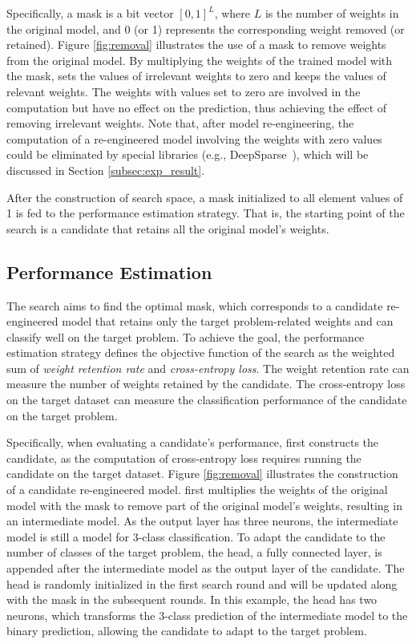 Specifically, a mask is a bit vector $[0,1]^L$, where $L$ is the number of weights in the original model, and 0 (or 1) represents the corresponding weight removed (or retained). 
Figure \ref{fig:removal} illustrates the use of a mask to remove weights from the original model.
By multiplying the weights of the trained model with the mask, \projectName sets the values of irrelevant weights to zero and keeps the values of relevant weights. 
The weights with values set to zero are involved in the computation but have no effect on the prediction, thus achieving the effect of removing irrelevant weights.
Note that, after model re-engineering, the computation of a re-engineered model involving the weights with zero values could be eliminated by special libraries (e.g., DeepSparse~\cite{deepsparse}), which will be discussed in Section \ref{subsec:exp_result}.


After the construction of search space, a mask initialized to all element values of 1 is fed to the performance estimation strategy. That is, the starting point of the search is a candidate that retains all the original model's weights.


\subsection{Performance Estimation}
The search aims to find the optimal mask, which corresponds to a candidate re-engineered model that retains only the target problem-related weights and can classify well on the target problem.
To achieve the goal, the performance estimation strategy defines the objective function of the search as the weighted sum of \textit{weight retention rate} and \textit{cross-entropy loss}.
The weight retention rate can measure the number of weights retained by the candidate.
The cross-entropy loss on the target dataset can measure the classification performance of the candidate on the target problem.

Specifically, when evaluating a candidate's performance, \projectName first constructs the candidate, as the computation of cross-entropy loss requires running the candidate on the target dataset.
Figure \ref{fig:removal} illustrates the construction of a candidate re-engineered model.
\projectName first multiplies the weights of the original model with the mask to remove part of the original model's weights, resulting in an intermediate model.
As the output layer has three neurons, the intermediate model is still a model for 3-class classification. 
To adapt the candidate to the number of classes of the target problem, the head, a fully connected layer, is appended after the intermediate model as the output layer of the candidate.
The head is randomly initialized in the first search round and will be updated along with the mask in the subsequent rounds.
In this example, the head has two neurons, which transforms the 3-class prediction of the intermediate model to the binary prediction, allowing the candidate to adapt to the target problem.

